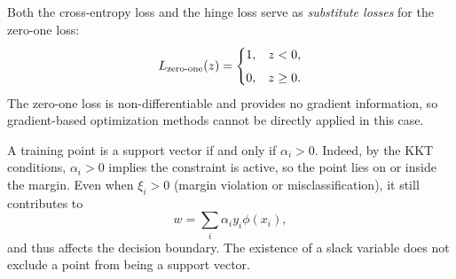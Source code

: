 \documentclass[../main]{subfiles}
\begin{document}
Both the cross-entropy loss and the hinge loss serve as \emph{substitute losses} for the zero-one loss:
\begin{equation}
    L_{\rm zero\text{-}one}(z) =
    \begin{cases}
        1, & z < 0,\\[4pt]
        0, & z \ge 0.
    \end{cases}
\end{equation}
The zero-one loss is non-differentiable and provides no gradient information,  
so gradient-based optimization methods cannot be directly applied in this case.
\begin{note}
A training point is a support vector if and only if $\alpha_i>0$.  
    Indeed, by the KKT conditions, $\alpha_i>0$ implies the constraint is active, so the point lies on or inside the margin. Even when $\xi_i>0$ (margin violation or misclassification), it still contributes to
    \[
    w=\sum_i \alpha_i y_i \phi(x_i),
    \]
    and thus affects the decision boundary. The existence of a slack variable does not exclude a point from being a support vector.
\end{note}
\end{document}
